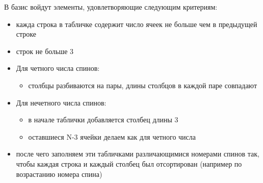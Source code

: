 \documentclass[]{article}
\begin{document}
В базис войдут элементы, удовлетворяющие следующим критериям:
\begin{itemize}
	\item кажда строка в табличке содержит число ячеек не больше чем в предыдущей строке
	\item строк не больше 3
	\item Для четного числа спинов:
	\begin{itemize}
		\item столбцы разбиваются на пары, длины столбцов в каждой паре совпадают
	\end{itemize}
	\item Для нечетного числа спинов:
	\begin{itemize}
		\item в начале таблички добавляется столбец длины 3
		\item оставшиеся N-3 ячейки делаем как для четного числа
	\end{itemize}
	\item после чего заполняем эти табличками различающимися номерами спинов так, чтобы каждая строка и каждый столбец был отсортирован (например по возрастанию номера спина)
\end{itemize}
\end{document}
